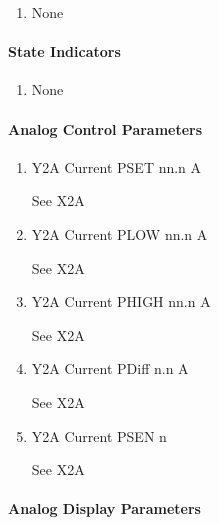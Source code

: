 \documentclass[11pt]{book}		%
\begin{document}
\begin{enumerate}
\item None
\end{enumerate}

\paragraph{State Indicators}

\begin{enumerate}
 \item None
\end{enumerate}

\paragraph{Analog Control Parameters}

\begin{enumerate}
 \item Y2A Current PSET   nn.n A

\color{red}
See X2A
\color{black}

 \item Y2A Current PLOW   nn.n A

\color{red}
See X2A
\color{black}

 \item Y2A Current PHIGH  nn.n A

\color{red}
See X2A
\color{black}

 \item Y2A Current PDiff n.n A

\color{red}
See X2A
\color{black}

 \item Y2A Current PSEN  n

\color{red}
See X2A
\color{black}

\end{enumerate}

\paragraph{Analog Display Parameters}
\end{document}
